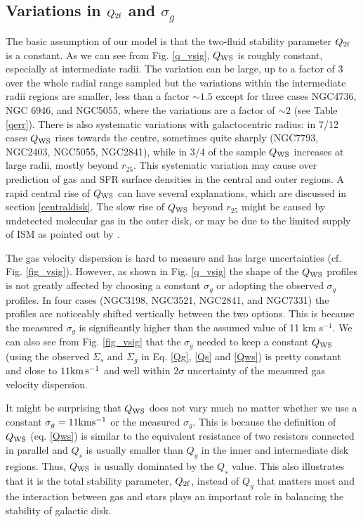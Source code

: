 \documentclass[12pt,preprint]{aastex}
\begin{document}
\subsection{Variations in $Q_{\rm 2f}$ and $\sigma_g$}
The basic assumption of our model is that the two-fluid stability parameter $Q_{\rm 2f}$ is a constant. As we can see from Fig. \ref{q_vsig},  $Q_{\rm WS}$ is roughly constant, especially at intermediate radii. The variation can be large, up to a factor of 3 over the whole radial range sampled but the variations within the intermediate radii regions are smaller, less than a factor $\sim 1.5$ except for three cases NGC4736, NGC 6946, and NGC5055, where the variations are a factor of $\sim 2$ (see Table \ref{qerr}). There is also systematic variations with galactocentric radius: in 7/12 cases $Q_{\rm WS}$ rises towards the centre, sometimes quite sharply (NGC7793, NGC2403, NGC5055, NGC2841), while in 3/4 of the sample $Q_{\rm WS}$ increases at large radii, mostly beyond $r_{25}$. This systematic variation may cause  over prediction of gas and SFR surface densities in the central and outer regions. A rapid central rise of $Q_{\rm WS}$ can have several explanations, which are discussed in section \ref{centraldisk}. The slow rise of $Q_{\rm WS}$ beyond  $r_{25}$ might be caused by undetected  molecular gas in the outer disk, or may be due to the limited supply of ISM as pointed out by \citet{meu13}.

The gas velocity dispersion is hard to measure \citep{tam09} and has large uncertainties (cf. Fig. \ref{fig_vsig}). However, as shown in Fig. \ref{q_vsig} the shape of the $Q_{\rm WS}$ profiles is not greatly affected by choosing a constant $\sigma_g$ or adopting the observed $\sigma_g$ profiles.  In four cases (NGC3198, NGC3521, NGC2841, and NGC7331) the profiles are noticeably shifted vertically between the two options.  This is because the measured $\sigma_g$ is significantly higher than the assumed value of 11 km s$^{-1}$.
 We can also see from Fig. \ref{fig_vsig} that 
the $\sigma_g$ needed to keep a constant $Q_{\rm WS}$ 
(using the observed $\Sigma_s$ and $\Sigma_g$ in Eq. \ref{Qg}, \ref{Qs} and \ref{Qws})
is pretty constant and close to $11 {\rm km\, s^{-1}}$ and 
well within $2\sigma$ uncertainty of the measured gas velocity dispersion.

It might be surprising that $Q_{\rm WS}$ does not vary much no matter whether we use a constant $\sigma_g= 11 {\rm km s^{-1}}$
or the measured $\sigma_g$. This is because the definition of $Q_{\rm WS}$ (eq. \ref{Qws}) is similar to the 
equivalent resistance of two resistors connected in parallel and  $Q_s$ is usually smaller than  $Q_g$
in the inner and intermediate disk regions. Thus,  $Q_{\rm WS}$ is usually dominated by the $Q_s$ value.
This also illustrates that it is the total stability parameter, $Q_{\rm 2f}$, instead of  $Q_g$ that matters most 
and the interaction between gas and stars  plays an important role in balancing the stability of galactic disk. 
\end{document}
